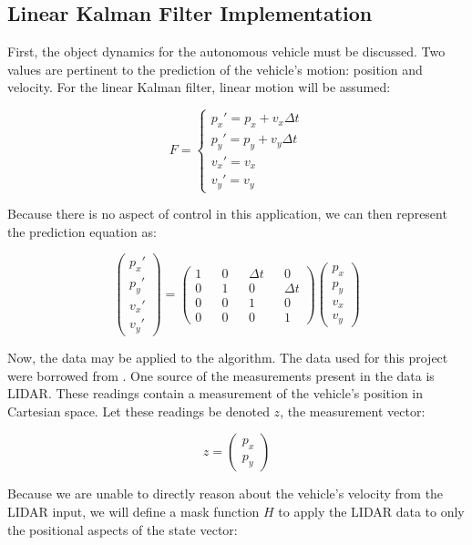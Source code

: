 \documentclass{article}
\begin{document}
\subsection{Linear Kalman Filter Implementation}
\label{ssec:lkfimp}

First, the object dynamics for the autonomous vehicle must be discussed. Two values are pertinent to the prediction of the vehicle's motion: position and velocity. For the linear Kalman filter, linear motion will be assumed:

$$
F = \begin{cases}
p_x'=p_x+v_x\Delta t\\
p_y'=p_y+v_y\Delta t\\
v_x'=v_x\\
v_y'=v_y
\end{cases}
$$

Because there is no aspect of control in this application, we can then represent the prediction equation as:

$$
\begin{pmatrix}
p_x'\\
p_y'\\
v_x'\\
v_y'
\end{pmatrix}=
\begin{pmatrix}
1 && 0 && \Delta t && 0\\
0 && 1 && 0 && \Delta t\\
0 && 0 && 1 && 0\\
0 && 0 && 0 && 1
\end{pmatrix}
\begin{pmatrix}
p_x\\
p_y\\
v_x\\
v_y
\end{pmatrix}
$$

Now, the data may be applied to the algorithm. The data used for this project were borrowed from \cite{gaskey19}. One source of the measurements present in the data is LIDAR. These readings contain a measurement of the vehicle's position in Cartesian space. Let these readings be denoted $z$, the measurement vector:

$$
z = \begin{pmatrix}
p_x\\
p_y
\end{pmatrix}
$$

Because we are unable to directly reason about the vehicle's velocity from the LIDAR input, we will define a mask function $H$ to apply the LIDAR data to only the positional aspects of the state vector:
\end{document}
